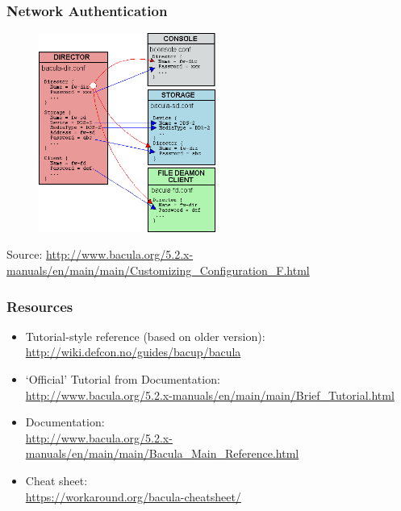\documentclass[10pt]{beamer}
\begin{document}
\begin{frame}
	\frametitle{Network Authentication}

\begin{figure}
\includegraphics[width=5.8cm]{./figures/BaculaAuth.png}
\end{figure}

{\scriptsize Source:  \url{http://www.bacula.org/5.2.x-manuals/en/main/main/Customizing_Configuration_F.html}}	
	
\end{frame}

\begin{frame}
  \frametitle{Resources}
 

\begin{itemize}


\item Tutorial-style reference (based on older version):\\ \url{http://wiki.defcon.no/guides/bacup/bacula}
\item `Official' Tutorial from Documentation:\\ \url{http://www.bacula.org/5.2.x-manuals/en/main/main/Brief_Tutorial.html}
\item Documentation:\\ \url{http://www.bacula.org/5.2.x-manuals/en/main/main/Bacula_Main_Reference.html}
\item Cheat sheet:\\ \url{https://workaround.org/bacula-cheatsheet/}

\end{itemize}
\end{frame}
\end{document}
